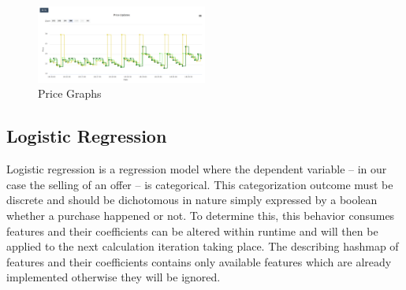 %
\begin{figure}[h]
    \centering
    \includegraphics[width=0.5\textwidth]{images/price_graphs_v2.png}
    \caption{Price Graphs}
    \label{fig:price_graphs_v2}
\end{figure}
%

%
\subsection{Logistic Regression}
\label{sec:Logistic_Regression}
%
Logistic regression is a regression model where the dependent variable -- in our case the selling of an offer -- is categorical. This categorization outcome must be discrete and should be dichotomous in nature simply expressed by a boolean whether a purchase happened or not. To determine this, this behavior consumes features and their coefficients can be altered within runtime and will then be applied to the next calculation iteration taking place. The describing hashmap of features and their coefficients contains only available features which are already implemented otherwise they will be ignored.
